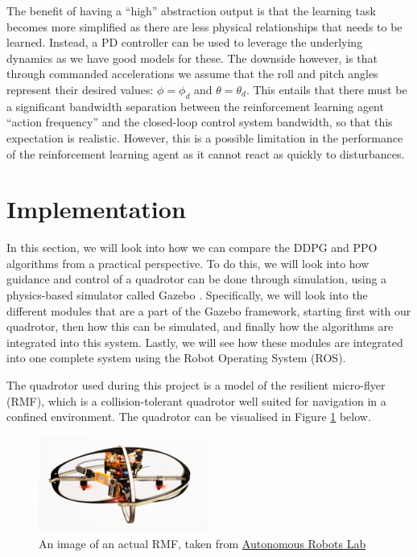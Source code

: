 The benefit of having a ``high'' abstraction output is that the learning task becomes more simplified as there are less physical relationships that needs to be learned. Instead, a PD controller can be used to leverage the underlying dynamics as we have good models for these. The downside however, is that through commanded accelerations we assume that the roll and pitch angles represent their desired values: $\phi = \phi_d$ and $\theta = \theta_d$. This entails that there must be a significant bandwidth separation between the reinforcement learning agent ``action frequency'' and the closed-loop control system bandwidth, so that this expectation is realistic. However, this is a possible limitation in the performance of the reinforcement learning agent as it cannot react as quickly to disturbances.

\section{Implementation}
In this section, we will look into how we can compare the DDPG and PPO algorithms from a practical perspective. To do this, we will look into how guidance and control of a quadrotor can be done through simulation, using a physics-based simulator called Gazebo \cite{Gazebo}.
Specifically, we will look into the different modules that are a part of the Gazebo framework, starting first with our quadrotor, then how this can be simulated, and finally how the algorithms are integrated into this system. Lastly, we will see how these modules are integrated into one complete system using the Robot Operating System (ROS).

The quadrotor used during this project is a model of the resilient micro-flyer (RMF), which is a collision-tolerant quadrotor well suited for navigation in a confined environment. The quadrotor can be visualised in Figure \ref{fig:4_1_rmf} below.
\begin{figure}[hbt]
    \centering
    \includegraphics[width=0.5\textwidth]{figures/4_/rf-side-view-free-flight_orig.png}
    \caption{An image of an actual RMF, taken from \href{https://www.autonomousrobotslab.com/}{Autonomous Robots Lab}}
    \label{fig:4_1_rmf}
\end{figure}


